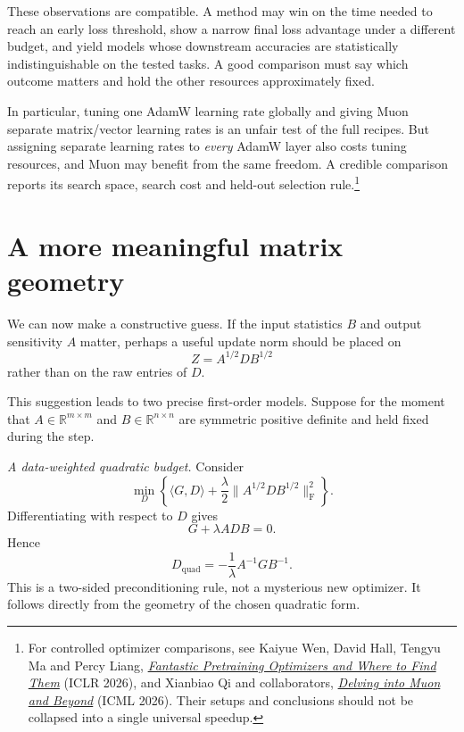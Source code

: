 These observations are compatible.  A method may win on the time needed to reach an early loss threshold, show a narrow final loss advantage under a different budget, and yield models whose downstream accuracies are statistically indistinguishable on the tested tasks.  A good comparison must say which outcome matters and hold the other resources approximately fixed.

In particular, tuning one AdamW learning rate globally and giving Muon separate matrix/vector learning rates is an unfair test of the full recipes.  But assigning separate learning rates to \emph{every} AdamW layer also costs tuning resources, and Muon may benefit from the same freedom.  A credible comparison reports its search space, search cost and held-out selection rule.\footnote{For controlled optimizer comparisons, see Kaiyue Wen, David Hall, Tengyu Ma and Percy Liang, \href{https://arxiv.org/abs/2509.02046}{\emph{Fantastic Pretraining Optimizers and Where to Find Them}} (ICLR 2026), and Xianbiao Qi and collaborators, \href{https://proceedings.mlr.press/v306/qi26c.html}{\emph{Delving into Muon and Beyond}} (ICML 2026).  Their setups and conclusions should not be collapsed into a single universal speedup.}

\section{A more meaningful matrix geometry}

We can now make a constructive guess.  If the input statistics \(B\) and output sensitivity \(A\) matter, perhaps a useful update norm should be placed on
\[
 Z=A^{1/2}DB^{1/2}
\]
rather than on the raw entries of \(D\).

This suggestion leads to two precise first-order models.  Suppose for the moment that \(A\in\mathbb R^{m\times m}\) and \(B\in\mathbb R^{n\times n}\) are symmetric positive definite and held fixed during the step.

\emph{A data-weighted quadratic budget.}  Consider
\begin{equation}
 \min_D\left\{\langle G,D\rangle+
      \frac{\lambda}{2}\|A^{1/2}DB^{1/2}\|_{\mathrm F}^2\right\}.
 \label{eq:N20261017-weighted-quadratic}
\end{equation}
Differentiating with respect to \(D\) gives
\[
 G+\lambda ADB=0.
\]
Hence
\begin{equation}
 D_{\mathrm{quad}}=-\frac{1}{\lambda}A^{-1}GB^{-1}.
 \label{eq:N20261017-two-sided-preconditioner}
\end{equation}
This is a two-sided preconditioning rule, not a mysterious new optimizer.  It follows directly from the geometry of the chosen quadratic form.

